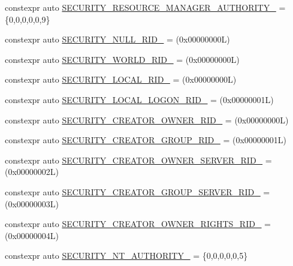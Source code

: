\begin{DoxyCompactItemize}
\item 
constexpr auto \mbox{\hyperlink{namespaceboost_1_1winapi_a7dcd2b2d0bb8e0ce4a1fedf5ad44b346}{S\+E\+C\+U\+R\+I\+T\+Y\+\_\+\+R\+E\+S\+O\+U\+R\+C\+E\+\_\+\+M\+A\+N\+A\+G\+E\+R\+\_\+\+A\+U\+T\+H\+O\+R\+I\+T\+Y\+\_\+}} = \{0,0,0,0,0,9\}
\item 
constexpr auto \mbox{\hyperlink{namespaceboost_1_1winapi_ad09726776c588b2f53be3af8034ec140}{S\+E\+C\+U\+R\+I\+T\+Y\+\_\+\+N\+U\+L\+L\+\_\+\+R\+I\+D\+\_\+}} = (0x00000000\+L)
\item 
constexpr auto \mbox{\hyperlink{namespaceboost_1_1winapi_afc00cff361c9e8cedeaeced0dcbf6066}{S\+E\+C\+U\+R\+I\+T\+Y\+\_\+\+W\+O\+R\+L\+D\+\_\+\+R\+I\+D\+\_\+}} = (0x00000000\+L)
\item 
constexpr auto \mbox{\hyperlink{namespaceboost_1_1winapi_ae0f27c6f288be120271d9e398534c3ae}{S\+E\+C\+U\+R\+I\+T\+Y\+\_\+\+L\+O\+C\+A\+L\+\_\+\+R\+I\+D\+\_\+}} = (0x00000000\+L)
\item 
constexpr auto \mbox{\hyperlink{namespaceboost_1_1winapi_a3a52634e5e8bbe97df87d1df3aa90856}{S\+E\+C\+U\+R\+I\+T\+Y\+\_\+\+L\+O\+C\+A\+L\+\_\+\+L\+O\+G\+O\+N\+\_\+\+R\+I\+D\+\_\+}} = (0x00000001\+L)
\item 
constexpr auto \mbox{\hyperlink{namespaceboost_1_1winapi_ac7b5db2467d479055bff8ead10f98a3f}{S\+E\+C\+U\+R\+I\+T\+Y\+\_\+\+C\+R\+E\+A\+T\+O\+R\+\_\+\+O\+W\+N\+E\+R\+\_\+\+R\+I\+D\+\_\+}} = (0x00000000\+L)
\item 
constexpr auto \mbox{\hyperlink{namespaceboost_1_1winapi_a87c285df645141b3be52fbddd9f59c51}{S\+E\+C\+U\+R\+I\+T\+Y\+\_\+\+C\+R\+E\+A\+T\+O\+R\+\_\+\+G\+R\+O\+U\+P\+\_\+\+R\+I\+D\+\_\+}} = (0x00000001\+L)
\item 
constexpr auto \mbox{\hyperlink{namespaceboost_1_1winapi_a59e0cf2a9abd95fd30667441800d852d}{S\+E\+C\+U\+R\+I\+T\+Y\+\_\+\+C\+R\+E\+A\+T\+O\+R\+\_\+\+O\+W\+N\+E\+R\+\_\+\+S\+E\+R\+V\+E\+R\+\_\+\+R\+I\+D\+\_\+}} = (0x00000002\+L)
\item 
constexpr auto \mbox{\hyperlink{namespaceboost_1_1winapi_a38c251e25e70b08f5bc375af503d2f55}{S\+E\+C\+U\+R\+I\+T\+Y\+\_\+\+C\+R\+E\+A\+T\+O\+R\+\_\+\+G\+R\+O\+U\+P\+\_\+\+S\+E\+R\+V\+E\+R\+\_\+\+R\+I\+D\+\_\+}} = (0x00000003\+L)
\item 
constexpr auto \mbox{\hyperlink{namespaceboost_1_1winapi_ab7685a81599a097e80c3c7e7eb19886f}{S\+E\+C\+U\+R\+I\+T\+Y\+\_\+\+C\+R\+E\+A\+T\+O\+R\+\_\+\+O\+W\+N\+E\+R\+\_\+\+R\+I\+G\+H\+T\+S\+\_\+\+R\+I\+D\+\_\+}} = (0x00000004\+L)
\item 
constexpr auto \mbox{\hyperlink{namespaceboost_1_1winapi_a42179cdbcae48c7fbbcff77045ed81a2}{S\+E\+C\+U\+R\+I\+T\+Y\+\_\+\+N\+T\+\_\+\+A\+U\+T\+H\+O\+R\+I\+T\+Y\+\_\+}} = \{0,0,0,0,0,5\}

\end{DoxyCompactItemize}
